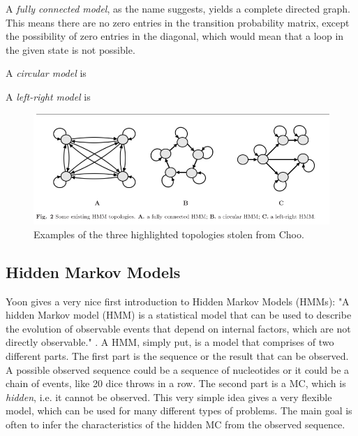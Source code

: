 \documentclass{article}
\begin{document}
A \textit{fully connected model}, as the name suggests, yields a complete directed graph. This means there are no zero entries in the transition probability matrix, except the possibility of zero entries in the diagonal, which would mean that a loop in the given state is not possible. 

A \textit{circular model} is

A \textit{left-right model} is

\begin{figure}
    \centering
    \includegraphics[width = \textwidth]{ChooHMMTopologies.png}
    \caption{Examples of the three highlighted topologies stolen from Choo.}
    \label{fig:ChooTopologies}
\end{figure}

\subsection{Hidden Markov Models}
Yoon gives a very nice first introduction to Hidden Markov Models (HMMs): "A hidden Markov model (HMM) is a statistical model that can be used to describe the evolution of observable events that depend on internal factors, which are not directly observable." \cite{Yoon2009}. A HMM, simply put, is a model that comprises of two different parts. The first part is the sequence or the result that can be observed. A possible observed sequence could be a sequence of nucleotides or it could be a chain of events, like 20 dice throws in a row. The second part is a MC, which is \textit{hidden}, i.e. it cannot be observed. This very simple idea gives a very flexible model, which can be used for many different types of problems. The main goal is often to infer the characteristics of the hidden MC from the observed sequence. 
\end{document}
